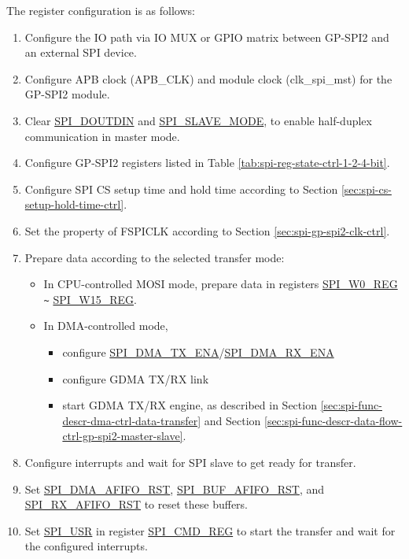\documentclass[main\_\_EN.tex]{subfiles}
\begin{document}
The register configuration is as follows:
\begin{enumerate}
    \item Configure the IO path via IO MUX or GPIO matrix between GP-SPI2 and an external SPI device.
    \item Configure APB clock (APB\_CLK) and module clock (clk\_spi\_mst) for the GP-SPI2 module.

    \item Clear \hyperref[fielddesc:SPIDOUTDIN]{SPI\_DOUTDIN} and \hyperref[fielddesc:SPISLAVEMODE]{SPI\_SLAVE\_MODE}, to enable half-duplex communication in master mode.

    \item Configure GP-SPI2 registers listed in Table \ref{tab:spi-reg-state-ctrl-1-2-4-bit}.

    \item Configure SPI CS setup time and hold time according to Section \ref{sec:spi-cs-setup-hold-time-ctrl}.

    \item Set the property of FSPICLK according to Section \ref{sec:spi-gp-spi2-clk-ctrl}.

    \item Prepare data according to the selected transfer mode:
    \begin{itemize}
        \item In CPU-controlled MOSI mode, prepare data in registers \hyperref[regdesc:SPIW0REG]{SPI\_W0\_REG} \verb+~+ \hyperref[regdesc:SPIW15REG]{SPI\_W15\_REG}.

        \item In DMA-controlled mode,
        \begin{itemize}
            \item configure \hyperref[fielddesc:SPIDMATXENA]{SPI\_DMA\_TX\_ENA}/\hyperref[fielddesc:SPIDMARXENA]{SPI\_DMA\_RX\_ENA}
            \item configure GDMA TX/RX link
            \item start GDMA TX/RX engine, as described in Section \ref{sec:spi-func-descr-dma-ctrl-data-transfer} and Section \ref{sec:spi-func-descr-data-flow-ctrl-gp-spi2-master-slave}.
        \end{itemize}
    \end{itemize}

    \item Configure interrupts and wait for SPI slave to get ready for transfer.

    \item Set \hyperref[fielddesc:SPIDMAAFIFORST]{SPI\_DMA\_AFIFO\_RST}, \hyperref[fielddesc:SPIBUFAFIFORST]{SPI\_BUF\_AFIFO\_RST}, and \hyperref[fielddesc:SPIRXAFIFORST]{SPI\_RX\_AFIFO\_RST} to reset these buffers.

    \item Set \hyperref[fielddesc:SPIUSR]{SPI\_USR} in register \hyperref[regdesc:SPICMDREG]{SPI\_CMD\_REG} to start the transfer and wait for the configured interrupts.
\end{enumerate}
\end{document}
